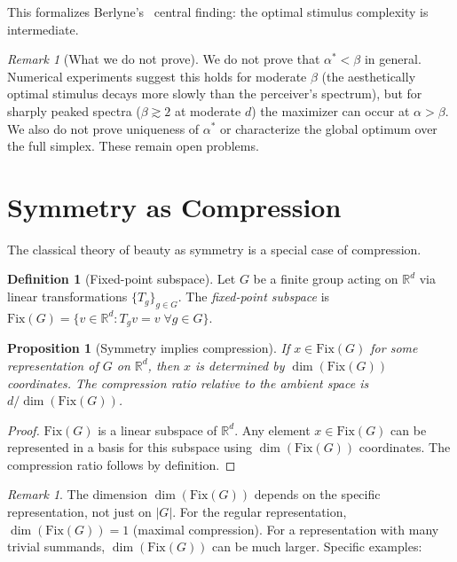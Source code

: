 \documentclass[journal]{IEEEtran}
\newtheorem{proposition}[theorem]{Proposition}
\theoremstyle{definition}
\newtheorem{definition}[theorem]{Definition}
\theoremstyle{remark}
\newtheorem{remark}[theorem]{Remark}
\newcommand{\R}{\mathbb{R}}
\begin{document}
This formalizes Berlyne's~\cite{berlyne1971aesthetics} central
finding: the optimal stimulus complexity is intermediate.

\begin{remark}[What we do not prove]
We do not prove that $\alpha^* < \beta$ in general.  Numerical
experiments suggest this holds for moderate $\beta$ (the aesthetically
optimal stimulus decays more slowly than the perceiver's spectrum),
but for sharply peaked spectra ($\beta \gtrsim 2$ at moderate $d$)
the maximizer can occur at $\alpha > \beta$.  We also do not prove
uniqueness of $\alpha^*$ or characterize the global optimum over the
full simplex.  These remain open problems.
\end{remark}


\section{Symmetry as Compression}
\label{sec:symmetry}

The classical theory of beauty as symmetry is a special case of
compression.

\begin{definition}[Fixed-point subspace]
Let $G$ be a finite group acting on $\R^d$ via linear
transformations $\{T_g\}_{g \in G}$.  The \emph{fixed-point
subspace} is $\mathrm{Fix}(G) = \{v \in \R^d : T_g v = v
\;\forall g \in G\}$.
\end{definition}

\begin{proposition}[Symmetry implies compression]
\label{prop:symmetry_compression}
If $x \in \mathrm{Fix}(G)$ for some representation of $G$ on
$\R^d$, then $x$ is determined by $\dim(\mathrm{Fix}(G))$
coordinates.  The compression ratio relative to the ambient space
is $d / \dim(\mathrm{Fix}(G))$.
\end{proposition}

\begin{proof}
$\mathrm{Fix}(G)$ is a linear subspace of $\R^d$.  Any element
$x \in \mathrm{Fix}(G)$ can be represented in a basis for this
subspace using $\dim(\mathrm{Fix}(G))$ coordinates.  The compression
ratio follows by definition.
\end{proof}

\begin{remark}
The dimension $\dim(\mathrm{Fix}(G))$ depends on the specific
representation, not just on $|G|$.  For the regular representation,
$\dim(\mathrm{Fix}(G)) = 1$ (maximal compression).  For a
representation with many trivial summands, $\dim(\mathrm{Fix}(G))$
can be much larger.  Specific examples:
\end{remark}
\end{document}

